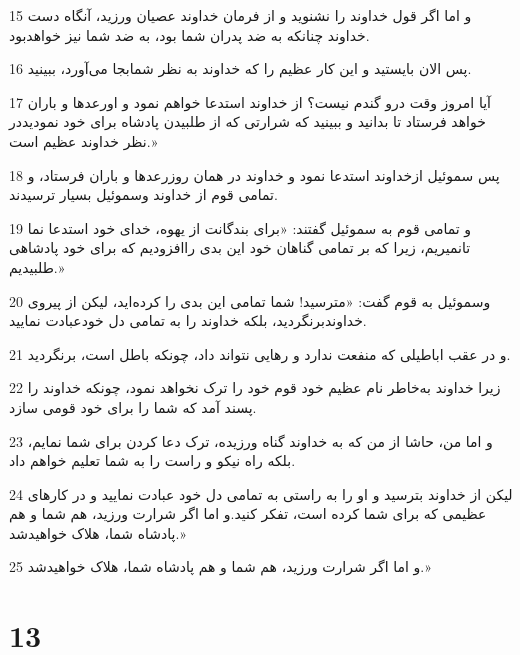 \par 15 و اما اگر قول خداوند را نشنوید و از فرمان خداوند عصیان ورزید، آنگاه دست خداوند چنانکه به ضد پدران شما بود، به ضد شما نیز خواهدبود.
\par 16 پس الان بایستید و این کار عظیم را که خداوند به نظر شمابجا می‌آورد، ببینید.
\par 17 آیا امروز وقت درو گندم نیست؟ از خداوند استدعا خواهم نمود و اورعدها و باران خواهد فرستاد تا بدانید و ببینید که شرارتی که از طلبیدن پادشاه برای خود نمودیددر نظر خداوند عظیم است.»
\par 18 پس سموئیل ازخداوند استدعا نمود و خداوند در همان روزرعدها و باران فرستاد، و تمامی قوم از خداوند وسموئیل بسیار ترسیدند.
\par 19 و تمامی قوم به سموئیل گفتند: «برای بندگانت از یهوه، خدای خود استدعا نما تانمیریم، زیرا که بر تمامی گناهان خود این بدی راافزودیم که برای خود پادشاهی طلبیدیم.»
\par 20 وسموئیل به قوم گفت: «مترسید! شما تمامی این بدی را کرده‌اید، لیکن از پیروی خداوندبرنگردید، بلکه خداوند را به تمامی دل خودعبادت نمایید.
\par 21 و در عقب اباطیلی که منفعت ندارد و رهایی نتواند داد، چونکه باطل است، برنگردید.
\par 22 زیرا خداوند به‌خاطر نام عظیم خود قوم خود را ترک نخواهد نمود، چونکه خداوند را پسند آمد که شما را برای خود قومی سازد.
\par 23 و اما من، حاشا از من که به خداوند گناه ورزیده، ترک دعا کردن برای شما نمایم، بلکه راه نیکو و راست را به شما تعلیم خواهم داد.
\par 24 لیکن از خداوند بترسید و او را به راستی به تمامی دل خود عبادت نمایید و در کارهای عظیمی که برای شما کرده است، تفکر کنید.و اما اگر شرارت ورزید، هم شما و هم پادشاه شما، هلاک خواهیدشد.»
\par 25 و اما اگر شرارت ورزید، هم شما و هم پادشاه شما، هلاک خواهیدشد.»
 
\chapter{13}

